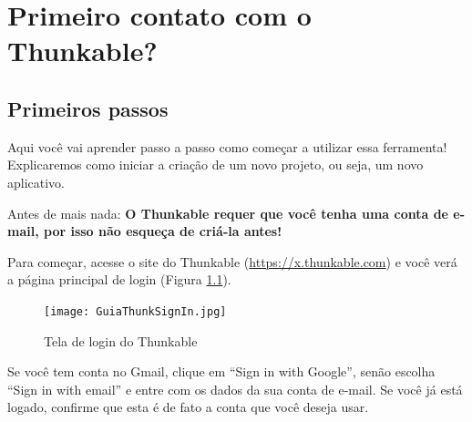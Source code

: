 \documentclass[11pt,fleqn]{book} %
\begin{document}
\pagestyle{empty} %

\tableofcontents %

\cleardoublepage %

\pagestyle{fancy} %



\chapter{Primeiro contato com o Thunkable?}\label{ch:thunkable}

\section{Primeiros passos}
Aqui você vai aprender passo a passo como começar a utilizar essa ferramenta! Explicaremos como iniciar a criação de um novo projeto, ou seja, um novo aplicativo.

Antes de mais nada: \textbf{O Thunkable requer que você tenha uma conta de e-mail, por isso não esqueça de criá-la antes!}

Para começar, acesse o site do Thunkable (\url{https://x.thunkable.com}) e você verá a página principal de login (Figura \ref{fig:guia1}).

\begin{figure}[h]
    \centering
    \texttt{[image: GuiaThunkSignIn.jpg]}
    \caption{Tela de login do Thunkable}\label{fig:guia1}
\end{figure}



Se você tem conta no Gmail, clique em ``Sign in with Google'', senão escolha ``Sign in with email'' e entre com os dados da sua conta de e-mail. Se você já está logado, confirme que esta é de fato a conta que você deseja usar.

 
\end{document}
